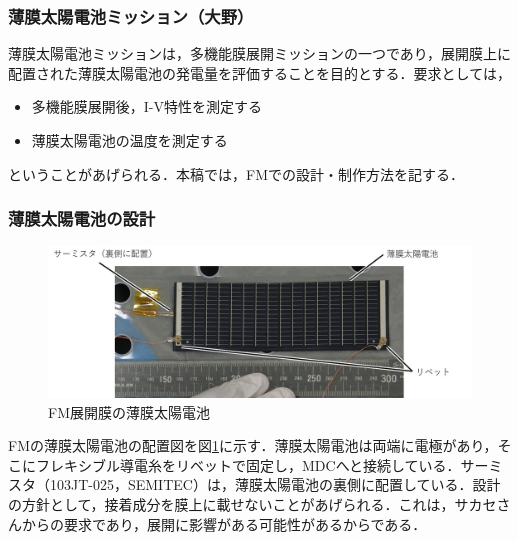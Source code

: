 \subsubsection{薄膜太陽電池ミッション（大野）}
薄膜太陽電池ミッションは，多機能膜展開ミッションの一つであり，展開膜上に配置された薄膜太陽電池の発電量を評価することを目的とする．要求としては，
\begin{itemize}
	\item 多機能膜展開後，I-V特性を測定する
	\item 薄膜太陽電池の温度を測定する
\end{itemize}
ということがあげられる．本稿では，FMでの設計・制作方法を記する．

\subsubsection*{薄膜太陽電池の設計}
\begin{figure}[H]
	\centering
	\includegraphics[scale=0.5]{03/fig/FM_TFSC.jpg}
	\caption{FM展開膜の薄膜太陽電池}
	\label{fig3-9-3-1}
\end{figure}
FMの薄膜太陽電池の配置図を図\ref{fig3-9-3-1}に示す．薄膜太陽電池は両端に電極があり，そこにフレキシブル導電糸をリベットで固定し，MDCへと接続している．サーミスタ（103JT-025，SEMITEC）は，薄膜太陽電池の裏側に配置している．設計の方針として，接着成分を膜上に載せないことがあげられる．これは，サカセさんからの要求であり，展開に影響がある可能性があるからである．


